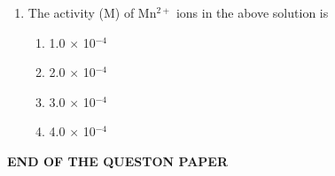 \documentclass[journal,12pt,onecolumn]{IEEEtran}
\theoremstyle{remark}
\begin{document}
\begin{enumerate}
\item  The activity (M) of Mn$^{2+}$ ions in the above solution is \hfill{}
\begin{multicols}{2}
\begin{enumerate}
    \item 1.0 $\times$ 10$^{-4}$
    \item 2.0 $\times$ 10$^{-4}$
    \item 3.0 $\times$ 10$^{-4}$
    \item 4.0 $\times$ 10$^{-4}$
\end{enumerate}
\end{multicols}

\end{enumerate}
\begin{center}
    \textbf{END OF THE QUESTON PAPER}
\end{center}
\end{document}
